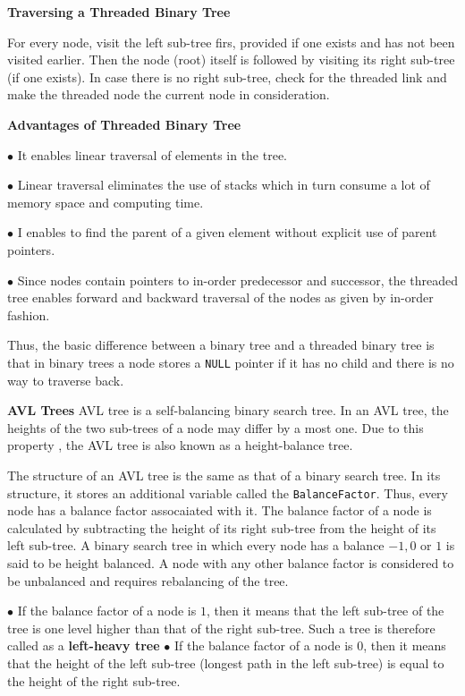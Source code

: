 \filbreak
\vskip 1cm
{\bf Traversing a Threaded Binary Tree}

\vskip 1mm
For every node, visit the left sub-tree firs, provided if one exists and has not been visited earlier. Then the node (root) itself is followed by visiting its right sub-tree (if one exists). In case there is no right sub-tree, check for the threaded link and make the threaded node the current node in consideration.

\vskip 3mm
{\bf Advantages of Threaded Binary Tree}

\qquad$\bullet$ It enables linear traversal of elements in the tree.

\vskip 3mm
\qquad$\bullet$ Linear traversal eliminates the use of stacks which in turn consume a lot of memory space and computing time.

\vskip 3mm
\qquad$\bullet$ I enables to find the parent of a given element without explicit use of parent pointers.

\vskip 3mm
\qquad$\bullet$ Since nodes contain pointers to in-order predecessor and successor, the threaded tree enables forward and backward traversal of the nodes as given by in-order fashion.

\vskip 3mm
Thus, the basic difference between a binary tree and a threaded binary tree is that in binary trees a node stores a {\tt NULL} pointer if it has no child and there is no way to traverse back.

\filbreak
\vskip 1cm
{\bf AVL Trees}
\vskip 1mm
AVL tree is a self-balancing binary search tree. In an AVL tree, the heights of the two sub-trees of a node may differ by a most one. Due to this property , the AVL tree is also known as a height-balance tree.

\vskip 1mm
The structure of an AVL tree is the same as that of a binary search tree. In its structure, it stores an additional variable called the {\tt BalanceFactor}. Thus, every node has a balance factor assocaiated with it. The balance factor of a node is calculated by subtracting the height of its right sub-tree from the height of its left sub-tree. A binary search tree in which every node has a balance $-1,0$ or $1$ is said to be height balanced. A node with any other balance factor is considered to be unbalanced and requires rebalancing of the tree.

$\bullet$ If the balance factor of a node is $1$, then it means that the left sub-tree of the tree is one level higher than that of the right sub-tree. Such a tree is therefore called as a {\bf left-heavy tree}
\vskip 3mm
$\bullet$ If the balance factor of a node is $0$, then it means that the height of the left sub-tree (longest path in the left sub-tree) is equal to the height of the right sub-tree.

